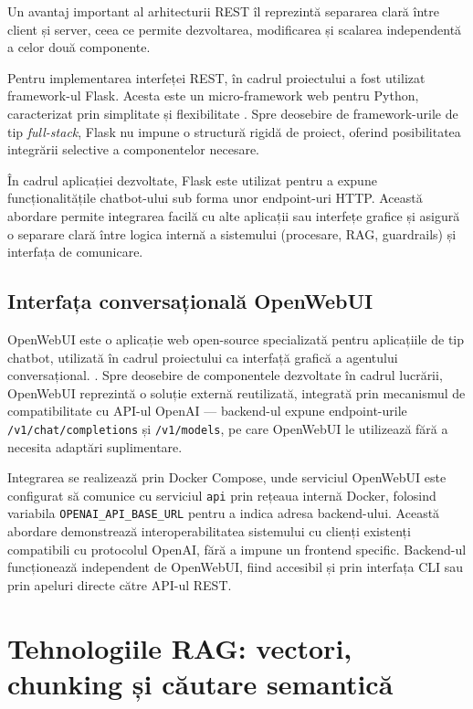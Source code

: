 \documentclass[12pt, a4paper, oneside, romanian]{teza-upb}
\begin{document}
Un avantaj important al arhitecturii REST îl reprezintă separarea clară între client și server, ceea ce permite dezvoltarea, modificarea și scalarea independentă a celor două componente.

Pentru implementarea interfeței REST, în cadrul proiectului a fost utilizat framework-ul Flask. Acesta este un micro-framework web pentru Python, caracterizat prin simplitate și flexibilitate \cite{flask_doc}. Spre deosebire de framework-urile de tip \textit{full-stack}, Flask nu impune o structură rigidă de proiect, oferind posibilitatea integrării selective a componentelor necesare.

În cadrul aplicației dezvoltate, Flask este utilizat pentru a expune funcționalitățile chatbot-ului sub forma unor endpoint-uri HTTP. Această abordare permite integrarea facilă cu alte aplicații sau interfețe grafice și asigură o separare clară între logica internă a sistemului (procesare, RAG, guardrails) și interfața de comunicare.

\subsection{Interfața conversațională OpenWebUI}

OpenWebUI este o aplicație web open-source specializată pentru aplicațiile de tip chatbot, utilizată în cadrul proiectului ca interfață grafică a agentului conversațional. \cite{openwebui_doc}. Spre deosebire de 
componentele dezvoltate în cadrul lucrării, OpenWebUI reprezintă o soluție 
externă reutilizată, integrată prin mecanismul de compatibilitate cu API-ul 
OpenAI — backend-ul expune endpoint-urile \texttt{/v1/chat/completions} și 
\texttt{/v1/models}, pe care OpenWebUI le utilizează fără a necesita adaptări 
suplimentare.

Integrarea se realizează prin Docker Compose, unde serviciul OpenWebUI este 
configurat să comunice cu serviciul \texttt{api} prin rețeaua internă Docker, 
folosind variabila \texttt{OPENAI\_API\_BASE\_URL} pentru a indica adresa 
backend-ului. Această abordare demonstrează interoperabilitatea sistemului cu 
clienți existenți compatibili cu protocolul OpenAI, fără a impune un frontend 
specific. Backend-ul funcționează independent de OpenWebUI, fiind accesibil 
și prin interfața CLI sau prin apeluri directe către API-ul REST.

\section{Tehnologiile RAG: vectori, chunking și căutare semantică}
\end{document}
